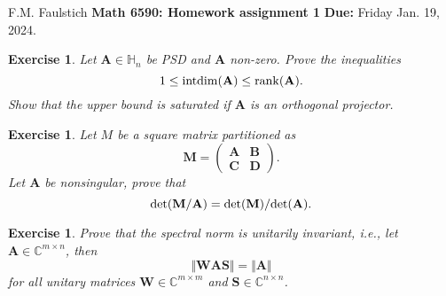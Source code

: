 \documentclass[11pt]{article}
\newcommand{\bvec}[1]{\mathbf{#1}}
\newcommand{\vA}{\bvec{A}}
\newcommand{\vB}{\bvec{B}}
\newcommand{\vC}{\bvec{C}}
\newcommand{\vD}{\bvec{D}}
\newcommand{\vM}{\bvec{M}}
\newcommand{\vS}{\bvec{S}}
\newcommand{\vW}{\bvec{W}}
\newtheorem{exercise}[theorem]{Exercise}
\begin{document}
\begin{flushleft}
F.M. Faulstich \hfill {\large\bf Math 6590: Homework assignment 1} \hfill {\bf Due:} Friday Jan. 19, 2024.\\
\end{flushleft}

\begin{exercise}
Let $\vA\in\mathbb{H}_n$ be PSD and $\vA$ non-zero. Prove the inequalities
\begin{equation}
1 \leq {\rm intdim}(\vA) \leq {\rm rank} (\vA).
\end{equation}
Show that the upper bound is saturated if $\vA$ is an orthogonal projector.
\end{exercise}

\begin{exercise}
Let $M$ be a square matrix partitioned as 
\begin{equation}
\vM = 
\begin{pmatrix}
\vA & \vB \\
\vC & \vD
\end{pmatrix}.
\end{equation}
Let $\vA$ be nonsingular, prove that
\begin{equation}
{\rm det}(\vM/\vA) = {\rm det}(\vM)/ {\rm det} (\vA).
\end{equation}
\end{exercise}

\begin{exercise}
Prove that the spectral norm is unitarily invariant, i.e., let $\vA\in\mathbb{C}^{m \times n}$, then
$$
\Vert \vW \vA \vS\Vert
=
\Vert  \vA \Vert
$$
for all unitary matrices $\vW \in\mathbb{C}^{m \times m}$ and $\vS\in\mathbb{C}^{n\times n}$.
\end{exercise}
\end{document}
